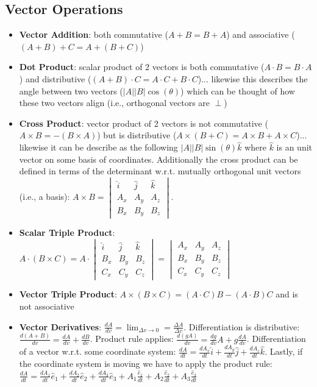 \documentclass{article}
\begin{document}
\subsection{Vector Operations}
\begin{itemize}
    \item \textbf{Vector Addition}: both commutative ($A + B = B + A$) and associative ($(A + B) + C = A + (B + C)$)
    \item \textbf{Dot Product}: scalar product of 2 vectors is both commutative ($A \cdot B = B \cdot A$) and distributive ($(A + B) \cdot C = A \cdot C + B \cdot C$)... likewise this describes the angle between two vectors ($|A||B|\cos(\theta)$) which can be thought of how these two vectors align (i.e., orthogonal vectors are $\perp$)
    \item \textbf{Cross Product}: vector product of 2 vectors is not commutative ($A \times B = -(B \times A)$) but is distributive ($A \times (B + C) = A \times B + A \times C$)... likewise it can be describe as the following $|A||B|\sin(\theta)\hat{k}$ where $\hat{k}$ is an unit vector on some basis of coordinates. Additionally the cross product can be defined in terms of the determinant w.r.t. mutually orthogonal unit vectors (i.e., a basis): $A \times B = \begin{vmatrix} \hat{i} & \hat{j} & \hat{k} \\ A_x & A_y & A_z \\ B_x & B_y & B_z \end{vmatrix}$.
    \item \textbf{Scalar Triple Product}: $A \cdot (B \times C) = A \cdot \begin{vmatrix} \hat{i} & \hat{j} & \hat{k} \\ B_x & B_y & B_z \\ C_x & C_y & C_z\end{vmatrix} = \begin{vmatrix}A_x & A_y & A_z \\ B_x & B_y & B_z \\ C_x & C_y & C_z\end{vmatrix}$
    \item \textbf{Vector Triple Product}: $A \times (B \times C) = (A \cdot C) B - (A \cdot B) C$ and is not associative
    \item \textbf{Vector Derivatives}: $\frac{dA}{dv} = \lim_{\Delta v \to 0} = \frac{\Delta A}{\Delta v}$. Differentiation is distributive: $\frac{d(A + B)}{dv} = \frac{dA}{dv} + \frac{dB}{dv}$. Product rule applies: $\frac{d(gA)}{dv} = \frac{dg}{dv}A + g\frac{dA}{dv}$. Differentiation of a vector w.r.t. some coordinate system: $\frac{dA}{dt} = \frac{dA_x}{dt}\hat{i} + \frac{dA_y}{dt}\hat{j} + \frac{dA_z}{dt}\hat{k}$. Lastly, if the coordinate system is moving we have to apply the product rule: $\frac{dA}{dt} = \frac{dA_1}{dt}\hat{e}_1 + \frac{dA_2}{dt}\hat{e}_2 + \frac{dA_3}{dt}\hat{e}_3 + A_1 \frac{\hat{e}_1}{dt} + A_2 \frac{\hat{e}_2}{dt} + A_3 \frac{\hat{e}_3}{dt}$
\end{itemize}
\end{document}
